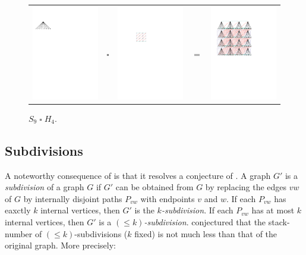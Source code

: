 \documentclass[kpfonts]{patmorin}
\renewcommand{\leq}{\leqslant}
\newcommand{\CartProd}{\mathbin{\square}}
\begin{document}
\begin{figure}
	\begin{center}
		\begin{tabular}{m{}m{2ex}m{}m{2ex}m{}}
			\includegraphics[width=.25\textwidth]{figs/s} & $\CartProd$ & \includegraphics[width=.25\textwidth]{figs/q} & $=$
			& \includegraphics[width=.3\textwidth]{figs/product}
		\end{tabular}
	\end{center}
	\caption{$S_9 \CartProd H_4$.}
	\label{graph}
\end{figure}


\subsection*{Subdivisions}

A noteworthy consequence of  is that it resolves a conjecture of \citet{BO99,BO01}. A graph $G'$ is a \textit{subdivision} of a graph $G$ if $G'$ can be obtained from $G$ by replacing the edges $vw$ of $G$ by internally disjoint paths $P_{vw}$ with endpoints $v$ and $w$. If each $P_{vw}$ has eaxctly $k$ internal vertices, then $G'$ is the \emph{$k$-subdivision}. If each $P_{vw}$ has at most $k$ internal vertices, then $G'$ is a \emph{$(\leq k)$-subdivision}. \citet{BO99} conjectured that the stack-number of $(\leq k)$-subdivisions ($k$ fixed)  is not much less than that of the original graph. More precisely:
\end{document}
